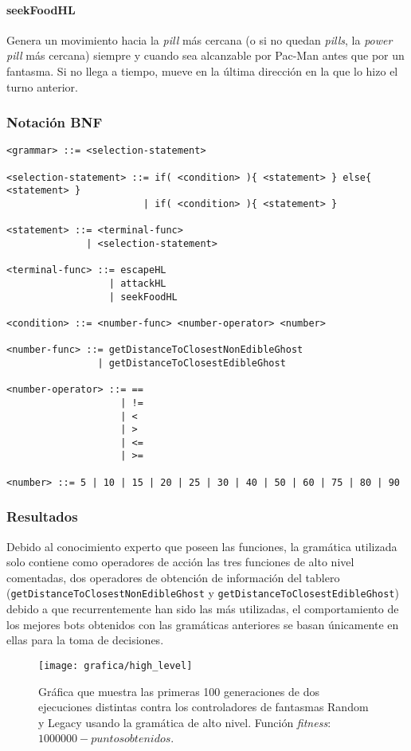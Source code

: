 \paragraph{seekFoodHL}
Genera un movimiento hacia la \textit{pill} más cercana (o si no quedan \textit{pills}, la \textit{power pill} más cercana) siempre y cuando sea alcanzable por Pac-Man antes que por un fantasma. Si no llega a tiempo, mueve en la última dirección en la que lo hizo el turno anterior.

\subsubsection{Notación BNF}
\begin{lstlisting}[frame=single, breaklines=no, basicstyle=\fontsize{10}{11}\ttfamily, caption={Gramática de alto nivel.}, captionpos=b]
<grammar> ::= <selection-statement>

<selection-statement> ::= if( <condition> ){ <statement> } else{ <statement> }
                        | if( <condition> ){ <statement> }

<statement> ::= <terminal-func>
              | <selection-statement>

<terminal-func> ::= escapeHL
                  | attackHL
                  | seekFoodHL

<condition> ::= <number-func> <number-operator> <number>

<number-func> ::= getDistanceToClosestNonEdibleGhost
                | getDistanceToClosestEdibleGhost

<number-operator> ::= ==
                    | !=
                    | <
                    | >
                    | <=
                    | >=

<number> ::= 5 | 10 | 15 | 20 | 25 | 30 | 40 | 50 | 60 | 75 | 80 | 90
\end{lstlisting}

\subsubsection{Resultados}
Debido al conocimiento experto que poseen las funciones, la gramática utilizada solo contiene como operadores de acción las tres funciones de alto nivel comentadas, dos operadores de obtención de información del tablero  (\texttt{getDistanceToClosestNonEdibleGhost} y \texttt{getDistanceToClosestEdibleGhost}) debido a que recurrentemente han sido las más utilizadas, el comportamiento de los mejores bots obtenidos con las gramáticas anteriores se basan únicamente en ellas para la toma de decisiones.
\begin{figure}[H]
\centering
\texttt{[image: grafica/high\_level]}
\caption{Gráfica que muestra las primeras 100 generaciones de dos ejecuciones distintas contra los controladores de fantasmas Random y Legacy usando la gramática de alto nivel. Función \textit{fitness}: $1000000 - puntos obtenidos$.}
\end{figure}

